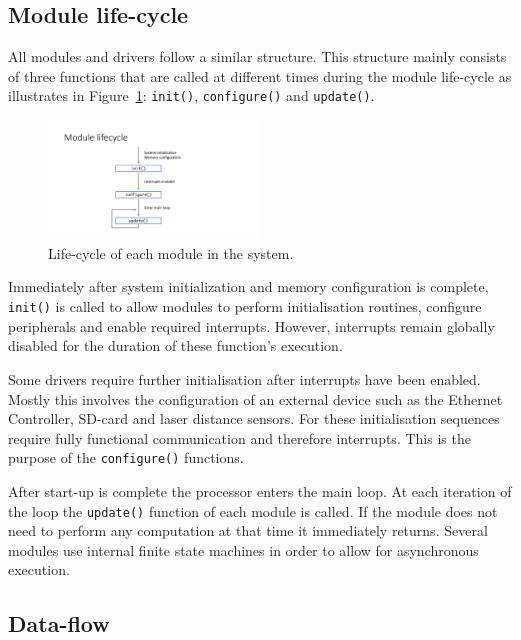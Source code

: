 \subsection{Module life-cycle}

All modules and drivers follow a similar structure. This structure mainly consists of three functions that are called at different times during the module life-cycle as illustrates in Figure~\ref{fig:module_lifecycle}: \texttt{init()}, \texttt{configure()} and \texttt{update()}.

\begin{figure}[H]
    \centering \includegraphics[width=0.5\textwidth]{./figures/module_lifecycle.pdf}
    \caption{Life-cycle of each module in the system.}
    \label{fig:module_lifecycle}
\end{figure}

Immediately after system initialization and memory configuration is complete, \texttt{init()} is called to allow modules to perform initialisation routines, configure peripherals and enable required interrupts. However, interrupts remain globally disabled for the duration of these function's execution.

Some drivers require further initialisation after interrupts have been enabled. Mostly this involves the configuration of an external device such as the Ethernet Controller, SD-card and laser distance sensors. For these initialisation sequences require fully functional communication and therefore interrupts. This is the purpose of the \texttt{configure()} functions.

After start-up is complete the processor enters the main loop. At each iteration of the loop the \texttt{update()} function of each module is called. If the module does not need to perform any computation at that time it immediately returns. Several modules use internal finite state machines in order to allow for asynchronous execution.

\subsection{Data-flow}

